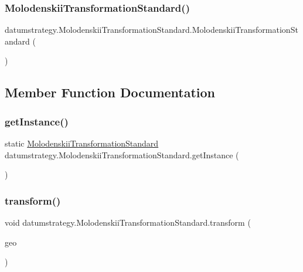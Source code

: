 \subsubsection{\texorpdfstring{Molodenskii\+Transformation\+Standard()}{MolodenskiiTransformationStandard()}}
{\footnotesize\ttfamily datumstrategy.\+Molodenskii\+Transformation\+Standard.\+Molodenskii\+Transformation\+Standard (\begin{DoxyParamCaption}{ }\end{DoxyParamCaption})\hspace{0.3cm}{\ttfamily [private]}}



\subsection{Member Function Documentation}
\mbox{\label{classdatumstrategy_1_1_molodenskii_transformation_standard_a09d8ecc0b04ffbfeb3b4ef4a6024e3f6}} 
\subsubsection{\texorpdfstring{get\+Instance()}{getInstance()}}
{\footnotesize\ttfamily static \hyperlink{classdatumstrategy_1_1_molodenskii_transformation_standard}{Molodenskii\+Transformation\+Standard} datumstrategy.\+Molodenskii\+Transformation\+Standard.\+get\+Instance (\begin{DoxyParamCaption}{ }\end{DoxyParamCaption})\hspace{0.3cm}{\ttfamily [static]}}

\mbox{\label{classdatumstrategy_1_1_molodenskii_transformation_standard_a8a1d2f121cb0484a0ba2ddee678d8276}} 
\subsubsection{\texorpdfstring{transform()}{transform()}}
{\footnotesize\ttfamily void datumstrategy.\+Molodenskii\+Transformation\+Standard.\+transform (\begin{DoxyParamCaption}\item[{\hyperlink{classcoordinates_1_1_geographic_coordinate_interface}{Geographic\+Coordinate\+Interface}}]{geo }\end{DoxyParamCaption})}




